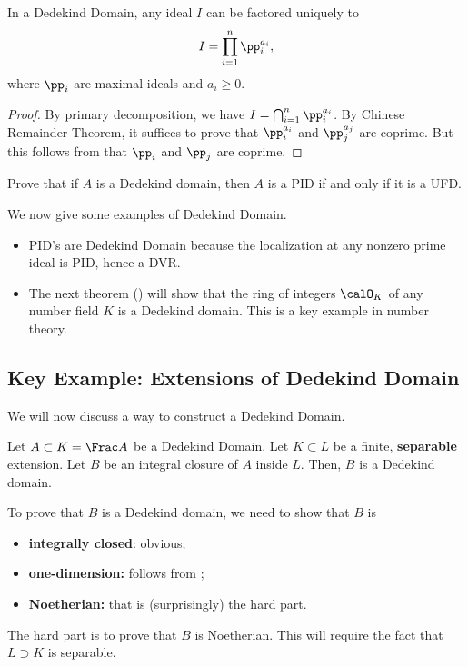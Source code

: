 \begin{corollary}
    In a Dedekind Domain, any ideal
    $I$ can be factored uniquely to
    $$I = \prod_{i=1}^n \pp_i^{a_i},$$
    where $\pp_i$ are maximal ideals and $a_i\geq 0$.
\end{corollary}
\begin{proof}
    By primary decomposition,
    we have $I=\bigcap_{i=1}^n \pp_i^{a_i}$.
    By Chinese Remainder Theorem,
    it suffices to prove that $\pp_i^{a_i}$ and $\pp_j^{a_j}$
    are coprime.
    But this follows from that $\pp_i$ and $\pp_j$ are coprime.
\end{proof}
\begin{exercise}
Prove that if $A$ is a Dedekind domain, then $A$ is a PID 
if and only if it is a UFD.
\end{exercise}
We now give some examples of Dedekind Domain.
\begin{example}
    \begin{itemize}
    \item PID's are Dedekind Domain because the localization at any nonzero prime ideal is PID, hence a DVR.
    \item The next theorem ()
    will show that the ring of integers $\calO_K$
    of any number field $K$ is a Dedekind domain.
    This is a key example in number theory.
    \end{itemize}
\end{example}
%
%
%
%
\subsection{Key Example: Extensions of Dedekind Domain}
We will now discuss a way to construct a Dedekind Domain.
\begin{theorem}
    \label{thm:aklb_dedekind}
    Let $A\subset K=\Frac A$ be a Dedekind Domain.
    Let $K\subset L$ be a finite, \textbf{separable} extension.
    Let $B$ be an integral closure of $A$ inside $L$.
    Then, $B$ is a Dedekind domain.
\end{theorem}
To prove that $B$ is a Dedekind domain, we need to show that
$B$ is
\begin{itemize}
    \item \textbf{integrally closed}: obvious;
    \item \textbf{one-dimension:} follows from ;
    \item \textbf{Noetherian:} that is (surprisingly) the hard part.
\end{itemize}
The hard part is to prove that $B$ is Noetherian.
This will require the fact that $L\supset K$ is separable.


